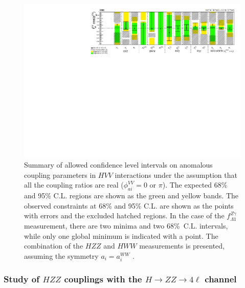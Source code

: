 \begin{figure}
  \centering
    \includegraphics[width=\textwidth]{Spin_Parity/Summary_spin0.pdf}
    \caption[Summary of allowed confidence level intervals on anomalous coupling parameters in $HVV$
interactions under the assumption that all the coupling ratios are real ($\phi_{ai}^{VV}=0$ or $\pi$).
The expected 68\% and 95\% C.L. regions are shown as the green and yellow bands.
The observed constraints at 68\% and 95\% C.L. are shown as the points with errors
and the excluded hatched regions.
In the case of the $f_{\Lambda1}^{Z\gamma}$ measurement, there are two minima and two
68\%~C.L. intervals, while only one global minimum is indicated with a point.
The combination of the  $HZZ$ and $HWW$ measurements is presented,
assuming the symmetry $a_i = a_i^{WW}$.]{
Summary of allowed confidence level intervals on anomalous coupling parameters in $HVV$
interactions under the assumption that all the coupling ratios are real ($\phi_{ai}^{VV}=0$ or $\pi$).
The expected 68\% and 95\% C.L. regions are shown as the green and yellow bands.
The observed constraints at 68\% and 95\% C.L. are shown as the points with errors
and the excluded hatched regions.
In the case of the $f_{\Lambda1}^{Z\gamma}$ measurement, there are two minima and two
68\%~C.L. intervals, while only one global minimum is indicated with a point.
The combination of the  $HZZ$ and $HWW$ measurements is presented,
assuming the symmetry $a_i = a_i^{WW}$ \cite{Khachatryan:2014kca}.
      \label{fig:spin0_summary}}

\end{figure}

\subsubsection{Study of $HZZ$ couplings with the $H\to ZZ\to 4\ell$ channel} \label{sec:Resultspinzerohzz}

